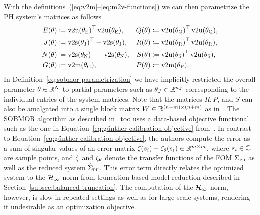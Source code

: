 With the definitions~(\ref{eq:v2m}--\ref{eq:m2v-functions}) we can then parametrize the \ac{PH} system's matrices as follows
\begin{equation}\label{eq:sobmor-parametrization}
    \begin{alignedat}{3}
        E(\theta) &\coloneqq {\vecupper(\theta_\msc{E})}\trans \vecupper(\theta_\msc{E}),\quad &Q(\theta) &\coloneqq {\vecupper(\theta_\msc{Q})}\trans \vecupper(\theta_\msc{Q}), \\
        J(\theta) &\coloneqq {\vecstrict(\theta_\msc{J})}\trans - \vecstrict(\theta_\msc{J}),\quad &R(\theta) &\coloneqq {\vecupper(\theta_\msc{R})}\trans \vecupper(\theta_\msc{R}), \\
        N(\theta) &\coloneqq {\vecstrict(\theta_\msc{N})}\trans - \vecstrict(\theta_\msc{N}),\quad &S(\theta) &\coloneqq {\vecupper(\theta_\msc{S})}\trans \vecupper(\theta_\msc{S}), \\
        G(\theta) &\coloneqq \vecmat(\theta_\msc{G}),\quad &P(\theta) &\coloneqq \vecmat(\theta_\msc{P}).
    \end{alignedat}
\end{equation}
In Definition~\eqref{eq:sobmor-parametrization} we have implicitly restricted the overall parameter $\theta \in \mathbb{R}^N$ to partial parameters such as $\theta_J \in \mathbb{R}^{n_J}$ corresponding to the individual entries of the system matrices.
Note that the matrices $R, P$, and $S$ can also be amalgated into a single block matrix $W \in \mathbb{R}^{(n + m) \times (n + m)}$ as in~\cite{Schwerdtner2021}.
The \ac{SOBMOR} algorithm as described in~\cite{SV2023} too uses a data-based objective functional such as the one in Equation~\eqref{eq:günther-calibration-objective} from~\cite{Günther2023}.
In contrast to Equation~\eqref{eq:günther-calibration-objective}, the authors compute the error as a sum of singular values of an error matrix $\zeta(s_i) - \zeta_\theta(s_i) \in \mathbb{R}^{m \times m}$, where $s_i \in \mathbb{C}$ are sample points, and $\zeta$ and $\zeta_\theta$ denote the transfer functions of the \ac{FOM} $\Sigma_{\textnormal{\scshape ph}}$ as well as the reduced system $\hat{\Sigma}_{\textnormal{\scshape ph}}$.
This error term directly relates the optimized system to the $\mathcal{H}_\infty$ norm from truncation-based model reduction described in Section~\ref{subsec:balanced-truncation}.
The computation of the $\mathcal{H}_\infty$ norm, however, is slow in repeated settings as well as for large scale systems, rendering it undesirable as an optimization objective.

